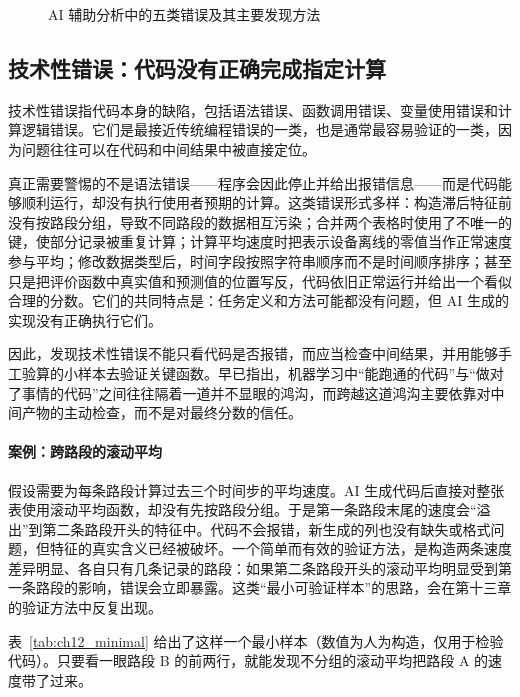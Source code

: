 \begin{figure}[H]
  \centering
  \caption{AI 辅助分析中的五类错误及其主要发现方法}
  \label{fig:ch12_layers}
\end{figure}

\subsection{技术性错误：代码没有正确完成指定计算}

技术性错误指代码本身的缺陷，包括语法错误、函数调用错误、变量使用错误和计算逻辑错误。它们是最接近传统编程错误的一类，也是通常最容易验证的一类，因为问题往往可以在代码和中间结果中被直接定位。

真正需要警惕的不是语法错误——程序会因此停止并给出报错信息——而是代码能够顺利运行，却没有执行使用者预期的计算。这类错误形式多样：构造滞后特征前没有按路段分组，导致不同路段的数据相互污染；合并两个表格时使用了不唯一的键，使部分记录被重复计算；计算平均速度时把表示设备离线的零值当作正常速度参与平均；修改数据类型后，时间字段按照字符串顺序而不是时间顺序排序；甚至只是把评价函数中真实值和预测值的位置写反，代码依旧正常运行并给出一个看似合理的分数。它们的共同特点是：任务定义和方法可能都没有问题，但 AI 生成的实现没有正确执行它们。

因此，发现技术性错误不能只看代码是否报错，而应当检查中间结果，并用能够手工验算的小样本去验证关键函数。\citet{domingos2012few}早已指出，机器学习中“能跑通的代码”与“做对了事情的代码”之间往往隔着一道并不显眼的鸿沟，而跨越这道鸿沟主要依靠对中间产物的主动检查，而不是对最终分数的信任。

\paragraph{案例：跨路段的滚动平均}

假设需要为每条路段计算过去三个时间步的平均速度。AI 生成代码后直接对整张表使用滚动平均函数，却没有先按路段分组。于是第一条路段末尾的速度会“溢出”到第二条路段开头的特征中。代码不会报错，新生成的列也没有缺失或格式问题，但特征的真实含义已经被破坏。一个简单而有效的验证方法，是构造两条速度差异明显、各自只有几条记录的路段：如果第二条路段开头的滚动平均明显受到第一条路段的影响，错误会立即暴露。这类“最小可验证样本”的思路，会在第十三章的验证方法中反复出现。

表~\ref{tab:ch12_minimal} 给出了这样一个最小样本（数值为人为构造，仅用于检验代码）。只要看一眼路段 B 的前两行，就能发现不分组的滚动平均把路段 A 的速度带了过来。

